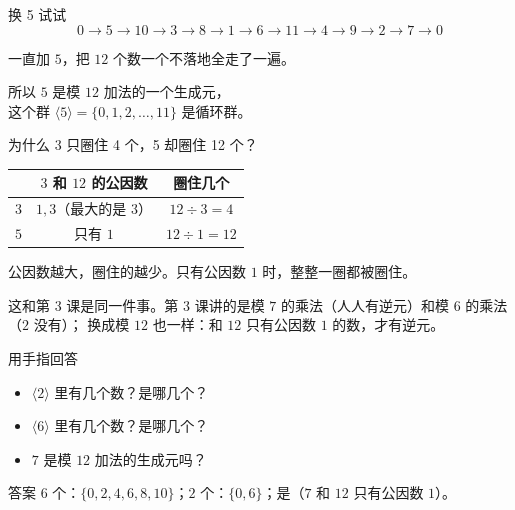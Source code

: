 \documentclass[10pt]{beamer}
\begin{document}
\begin{frame}{换 5 试试}
  \[
    0 \to 5 \to 10 \to 3 \to 8 \to 1 \to 6 \to 11 \to 4 \to 9 \to 2 \to 7 \to 0
  \]
  \pause
  \begin{center}
    {\large 一直加 \(5\)，把 \(12\) 个数一个不落地全走了一遍。}
  \end{center}
  \pause
  \begin{center}
    {\large 所以 \(5\) 是模 \(12\) 加法的一个生成元，\\
    这个群 \(\langle 5\rangle=\{0,1,2,\dots,11\}\) 是循环群。}
  \end{center}
\end{frame}

\begin{frame}{为什么 3 只圈住 4 个，5 却圈住 12 个？}
  \begin{center}
  \begin{tabular}{@{}lcc@{}}
    \toprule
     & \(3\) 和 \(12\) 的公因数 & 圈住几个 \\
    \midrule
    \(3\) & \(1,3\)（最大的是 \(3\)） & \(12\div3=4\) \\
    \(5\) & 只有 \(1\) & \(12\div1=12\) \\
    \bottomrule
  \end{tabular}
  \end{center}
  \pause
  \begin{center}
    {\large 公因数越大，圈住的越少。\quad 只有公因数 \(1\) 时，整整一圈都被圈住。}
  \end{center}
  \pause
  \begin{att}
    这和第 3 课是同一件事。第 3 课讲的是模 \(7\) 的乘法（人人有逆元）和模 \(6\) 的乘法（\(2\) 没有）；
    换成模 \(12\) 也一样：和 \(12\) 只有公因数 \(1\) 的数，才有逆元。
  \end{att}
\end{frame}

\begin{frame}{用手指回答}
  \begin{itemize}
    \item \(\langle 2\rangle\) 里有几个数？是哪几个？
    \item \(\langle 6\rangle\) 里有几个数？是哪几个？
    \item \(7\) 是模 \(12\) 加法的生成元吗？
  \end{itemize}
  \pause
  \begin{block}{答案}
    \(6\) 个：\(\{0,2,4,6,8,10\}\)；\quad \(2\) 个：\(\{0,6\}\)；\quad 是（\(7\) 和 \(12\) 只有公因数 \(1\)）。
  \end{block}
\end{frame}
\end{document}
